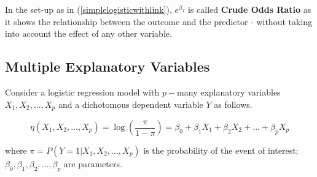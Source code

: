 \documentclass[11pt, a4paper]{article}
\begin{document}
In the set-up as in (\ref{simplelogisticwithlink}), $e^{\beta_1}$ is called \textbf{Crude Odds Ratio} as it shows the relationship between the outcome and the predictor - without taking into account the effect of any other variable.

\subsection{Multiple Explanatory Variables}

Consider a logistic regression model with $p-$many explanatory variables $X_1, X_2, \ldots, X_p$ and a dichotomous dependent variable $Y$ as follows.

\begin{equation}\label{multiplelogisticwithlink}
\eta(X_1, X_2, \ldots, X_p) = \log \left( \dfrac{\pi}{1 - \pi} \right) = \beta_0 + \beta_1 X_1 + \beta_2 X_2 + \ldots + \beta_p X_p
\end{equation}

where $\pi = P(Y = 1 |X_1, X_2, \ldots, X_p)$ is the probability of the event of interest; $\beta_0, \beta_1, \beta_2, \ldots, \beta_p$ are parameters.
\end{document}
